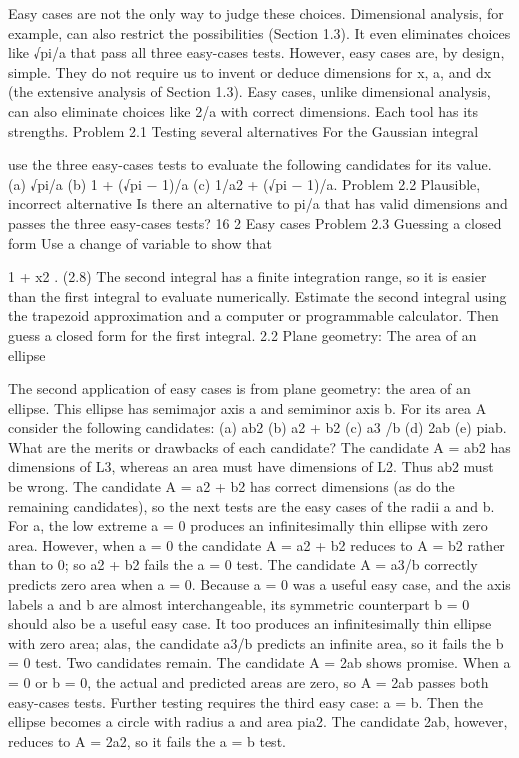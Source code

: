 \documentclass[a4paper]{article}
\begin{document}
Easy cases are not the only way to judge these choices. Dimensional analysis,
for example, can also restrict the possibilities (Section 1.3). It even
eliminates choices like √pi/a that pass all three easy-cases tests. However,
easy cases are, by design, simple. They do not require us to invent or
deduce dimensions for x, a, and dx (the extensive analysis of Section 1.3).
Easy cases, unlike dimensional analysis, can also eliminate choices like
2/a with correct dimensions. Each tool has its strengths.
Problem 2.1 Testing several alternatives
For the Gaussian integral

use the three easy-cases tests to evaluate the following candidates for its value.
(a) √pi/a (b) 1 + (√pi − 1)/a (c) 1/a2 + (√pi − 1)/a.
Problem 2.2 Plausible, incorrect alternative
Is there an alternative to pi/a that has valid dimensions and passes the three
easy-cases tests?
16 2 Easy cases
Problem 2.3 Guessing a closed form
Use a change of variable to show that

1 + x2 . (2.8)
The second integral has a finite integration range, so it is easier than the first
integral to evaluate numerically. Estimate the second integral using the trapezoid
approximation and a computer or programmable calculator. Then guess a closed
form for the first integral.
2.2 Plane geometry: The area of an ellipse

The second application of easy cases is from plane
geometry: the area of an ellipse. This ellipse has
semimajor axis a and semiminor axis b. For its area A
consider the following candidates:
(a) ab2 (b) a2 + b2 (c) a3
/b (d) 2ab (e) piab.
What are the merits or drawbacks of each candidate?
The candidate A = ab2 has dimensions of L3, whereas an area must have
dimensions of L2. Thus ab2 must be wrong.
The candidate A = a2 + b2 has correct dimensions (as do the remaining
candidates), so the next tests are the easy cases of the radii a and b. For a,
the low extreme a = 0 produces an infinitesimally thin ellipse with zero
area. However, when a = 0 the candidate A = a2 + b2 reduces to A = b2
rather than to 0; so a2 + b2 fails the a = 0 test.
The candidate A = a3/b correctly predicts zero area when a = 0. Because
a = 0 was a useful easy case, and the axis labels a and b are almost
interchangeable, its symmetric counterpart b = 0 should also be a useful
easy case. It too produces an infinitesimally thin ellipse with zero area;
alas, the candidate a3/b predicts an infinite area, so it fails the b = 0 test.
Two candidates remain.
The candidate A = 2ab shows promise. When a = 0 or b = 0, the
actual and predicted areas are zero, so A = 2ab passes both easy-cases
tests. Further testing requires the third easy case: a = b. Then the ellipse
becomes a circle with radius a and area pia2. The candidate 2ab, however,
reduces to A = 2a2, so it fails the a = b test.
\end{document}
